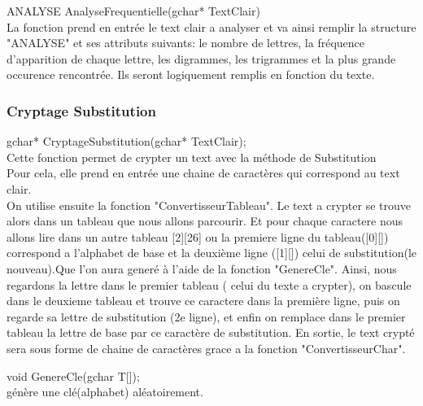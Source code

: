 \documentclass[a4]{article}
\begin{document}
		
		
	ANALYSE AnalyseFrequentielle(gchar* TextClair)\\
		La fonction prend en entrée le text clair a analyser et va ainsi remplir la structure "ANALYSE" et 
		ses attributs suivants:
		le nombre de lettres, la fréquence d'apparition de chaque lettre, les digrammes, les trigrammes
		et la plus grande occurence rencontrée. Ils seront logiquement remplis en fonction du texte.\\
		
	\subsubsection{Cryptage Substitution}
	gchar* CryptageSubstitution(gchar* TextClair);\\
		Cette fonction permet de crypter un text avec la méthode de Substitution\\
		Pour cela, elle prend en entrée une chaine de caractères qui correspond au text clair.\\
		On utilise ensuite la fonction "ConvertisseurTableau".
		Le text a crypter se trouve alors dans un tableau que nous allons parcourir. Et pour chaque caractere 
		nous allons lire dans un autre tableau [2][26] ou la premiere ligne du tableau([0][]) correspond a l'alphabet
		de base et la deuxième ligne ([1][]) celui de substitution(le nouveau).Que l'on aura generé à l'aide de la fonction "GenereCle". Ainsi, nous regardons la lettre dans 
		le premier tableau ( celui du texte a crypter), on bascule dans le deuxieme tableau et trouve ce caractere dans la première ligne, puis on regarde sa lettre de substitution (2e ligne), et enfin on remplace dans le premier tableau 
		la lettre de base par ce caractère de substitution. En sortie, le text crypté sera sous forme de chaine de caractères grace a la fonction "ConvertisseurChar".
		
	void GenereCle(gchar T[]);\\
		génère une clé(alphabet) aléatoirement.
	
\end{document}
